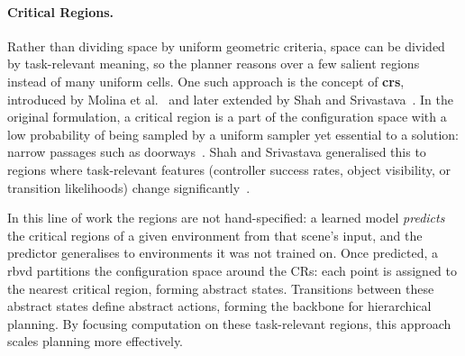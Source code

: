 

\paragraph{Critical Regions.}
Rather than dividing space by uniform geometric criteria, space can be divided by task-relevant meaning, so the planner reasons over a few salient regions instead of many uniform cells. One such approach is the concept of \textbf{\acp{cr}}, introduced by Molina et al.~\cite{molina2020learn} and later extended by Shah and Srivastava~\cite{shah2022abstractions}. In the original formulation, a critical region is a part of the configuration space with a low probability of being sampled by a uniform sampler yet essential to a solution: narrow passages such as doorways~\cite{molina2020learn}. Shah and Srivastava generalised this to regions where task-relevant features (controller success rates, object visibility, or transition likelihoods) change significantly~\cite{shah2022abstractions}.

In this line of work the regions are not hand-specified: a learned model \emph{predicts} the critical regions of a given environment from that scene's input, and the predictor generalises to environments it was not trained on. Once predicted, a \ac{rbvd} partitions the configuration space around the CRs: each point is assigned to the nearest critical region, forming abstract states. Transitions between these abstract states define abstract actions, forming the backbone for hierarchical planning. By focusing computation on these task-relevant regions, this approach scales planning more effectively.
